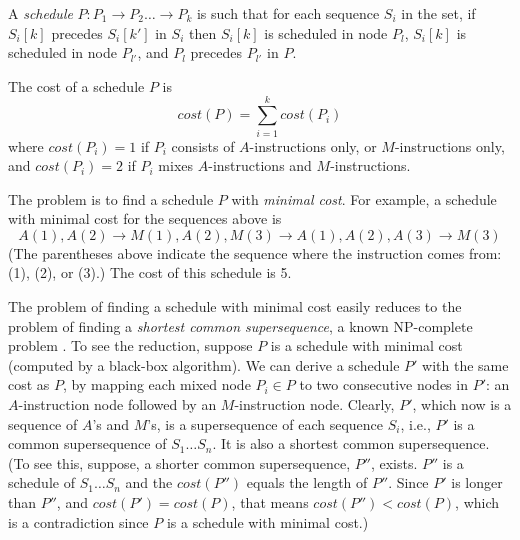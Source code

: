 \documentclass[sigconf, screen, natbib=false, dvipsnames, table]{acmart}
\theoremstyle{definition}
\begin{document}
A \emph{schedule} $P: P_1 \rightarrow P_2 \dots \rightarrow P_k$ is such that for each sequence 
$S_i$ in the set, if $S_i[k]$ precedes $S_i[k']$ in $S_i$ then $S_i[k]$ is scheduled in node $P_l$, $S_i[k]$ 
is scheduled in node $P_{l'}$, and $P_l$ precedes $P_{l'}$ in $P$. 

The cost of a schedule $P$ is 
\[\mathit{cost}(P) = \sum_{i=1}^k \mathit{cost}(P_i)\]
where $\mathit{cost}(P_i) = 1$ if $P_i$ consists of $A$-instructions only, or $M$-instructions only, 
and $\mathit{cost}(P_i) = 2$ if $P_i$ mixes $A$-instructions and $M$-instructions. 

The problem is to find a schedule $P$ with \emph{minimal cost}. For example, 
a schedule with minimal cost for the sequences above is
\[ A(1), A(2) \rightarrow M(1), A(2), M(3) \rightarrow A(1), A(2), A(3) \rightarrow M(3) \]
(The parentheses above indicate the sequence where the instruction comes from: (1), (2), or (3).)
The cost of this schedule is 5. 

The problem of finding a schedule with minimal cost 
easily reduces to the problem of finding a \emph{shortest common supersequence}, 
a known NP-complete problem . To see the reduction, 
suppose $P$ is a schedule with minimal cost (computed by a black-box algorithm). 
We can derive a schedule $P'$ with the same cost as $P$, by mapping each mixed node $P_i \in P$ 
to two consecutive nodes in $P'$: an $A$-instruction node followed by an $M$-instruction node.
Clearly, $P'$, which now is a sequence of $A$'s and $M$'s, is a supersequence of each sequence 
$S_i$, i.e., $P'$ is a common supersequence 
of $S_1 \dots S_n$. It is also a shortest common supersequence. (To see this, suppose, a 
shorter common supersequence, $P''$, exists. $P''$ is a schedule of $S_1 \dots S_n$
and the $\mathit{cost}(P'')$ equals the length of $P''$. Since $P'$ is longer than
$P''$, and $\mathit{cost}(P') = \mathit{cost}(P)$, that means $\mathit{cost}(P'') < \mathit{cost}(P)$, 
which is a contradiction since $P$ is a schedule with minimal cost.)



\end{document}
